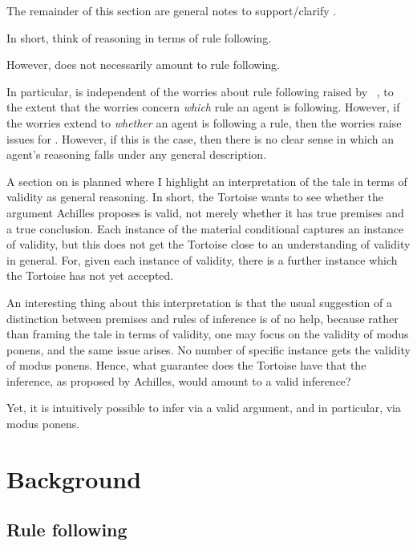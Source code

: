 {
  \color{red}

  The remainder of this section are general notes to support/clarify \sR{}.

  In short, think of reasoning in terms of rule following.

  However, \sR{} does not necessarily amount to rule following.

  In particular, \sR{} is independent of the worries about rule following raised by ~\textcite{Kripke:1982aa}, to the extent that the worries concern \emph{which} rule an agent is following.
  However, if the worries extend to \emph{whether} an agent is following a rule, then the worries raise issues for \sR{}.
  However, if this is the case, then there is no clear sense in which an agent's reasoning falls under any general description.

  A section on \textcite{Carroll:1895uj} is planned where I highlight an interpretation of the tale in terms of validity as general reasoning.
  In short, the Tortoise wants to see whether the argument Achilles proposes is valid, not merely whether it has true premises and a true conclusion.
  Each instance of the material conditional captures an instance of validity, but this does not get the Tortoise close to an understanding of validity in general.
  For, given each instance of validity, there is a further instance which the Tortoise has not yet accepted.

  An interesting thing about this interpretation is that the usual suggestion of a distinction between premises and rules of inference is of no help, because rather than framing the tale in terms of validity, one may focus on the validity of modus ponens, and the same issue arises.
  No number of specific instance gets the validity of modus ponens.
  Hence, what guarantee does the Tortoise have that the inference, as proposed by Achilles, would amount to a valid inference?

  Yet, it is intuitively possible to infer via a valid argument, and in particular, via modus ponens.
}

\section{Background}
\label{sec:background}

\subsection{Rule following}

